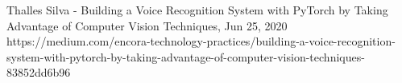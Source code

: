 
Thalles Silva - Building a Voice Recognition System with PyTorch by Taking Advantage of Computer Vision Techniques, Jun 25, 2020
https://medium.com/encora-technology-practices/building-a-voice-recognition-system-with-pytorch-by-taking-advantage-of-computer-vision-techniques-83852dd6b96
